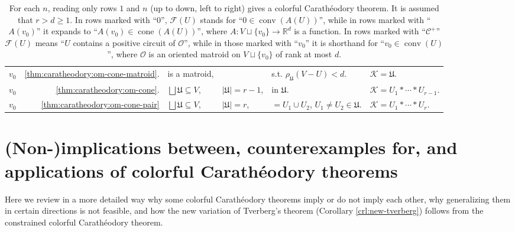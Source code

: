 \documentclass[a4paper,11pt,reqno, english]{amsart}
\theoremstyle{definition}
\theoremstyle{remark}
\newcommand\R{\mathbb R}
\DeclareMathOperator{\cone}{\mathrm{cone}}
\DeclareMathOperator{\conv}{\mathrm{conv}}
\begin{document}
\begin{table}[ht]
\begin{tabular}{c|r|ll|l|l|}
        $v_0$ &
        \ref{thm:caratheodory:om-cone-matroid}. &
        is a matroid, &
        &
        s.t. $\rho_\mathfrak{U}(V-U)<d$. &
        $\mathscr{K}=\mathfrak{U}$.\\\cline{2-6}
        $v_0$ &
        \ref{thm:caratheodory:om-cone}. &
        $\bigsqcup\mathfrak{U}\subseteq V$, &
        $|\mathfrak{U}|=r-1$, &
        in $\mathfrak{U}$. &
        $\mathscr{K}=U_1*\cdots*U_{r-1}$. \\\cline{2-6}
        $v_0$ &
        \ref{thm:caratheodory:om-cone-pair} &
        $\bigsqcup\mathfrak{U}\subseteq V$, &
        $|\mathfrak{U}|=r$, &
        \makecell[l]{$=U_1\cup U_2$,\\$U_1\neq U_2\in\mathfrak{U}$.} &
        $\mathscr{K}=U_1*\cdots*U_r$. \\\cline{2-6}        
    \end{tabular}
    \caption{For each $n$, reading only rows $1$ and $n$ (up to down, left to right) gives a colorful Carath\'eodory theorem. It is assumed that $r>d\geq1$. In rows marked with ``$0$'', $\mathscr{F}(U)$ stands for ``$0\in\conv(A(U))$'', while in rows marked with ``$A(v_0)$'' it expands to ``$A(v_0)\in\cone(A(U))$'', where $A\colon {V\sqcup\{v_0\}}\to\R^d$ is a function. In rows marked with ``$\mathscr{C}^+$'' $\mathscr{F}(U)$ means ``$U$ contains a positive circuit of $\mathscr{O}$'', while in those marked with ``$v_0$'' it is shorthand for ``$v_0\in\conv(U)$'', where $\mathscr{O}$ is an oriented matroid on $V\sqcup\{v_0\}$ of rank at most $d$.}
    \label{tbl:caratheodory-thms}
\end{table}

\bigskip
\section{(Non-)implications between, counterexamples for, and applications of colorful Carath\'eodory theorems}\label{sec:applications-and-limits}
\bigskip

Here we review in a more detailed way why some colorful Carath\'eodory theorems imply or do not imply each other, why generalizing them in certain directions is not feasible, and how the new variation of Tverberg's theorem (Corollary \ref{crl:new-tverberg}) follows from the constrained colorful Carath\'eodory theorem.
\end{document}
